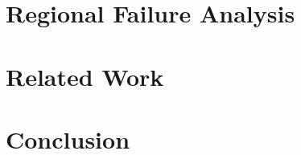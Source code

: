 \documentclass{sig-alternate-10pt}
\begin{document}
    \section{Regional Failure Analysis}
        \label{sec:failures} 
        
        
    \section{Related Work}
        \label{sec:related_work}
        

    \section{Conclusion}
        \label{sec:conclusion}    
        





%
\end{document}
